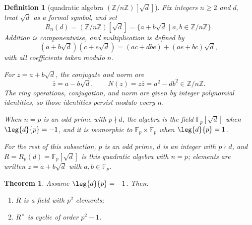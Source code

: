\documentclass[11pt]{article}
\theoremstyle{ntstyle}
\newtheorem{theorem}{Theorem}[subsection]
\newtheorem{definition}{Definition}[subsection]
\begin{document}
\begin{definition}[{quadratic algebra $(\mathbb{Z}/n\mathbb{Z})[\sqrt{d}]$}]\label{def:7.9.1}
	Fix integers $n\ge2$ and $d$, treat $\sqrt d$ as a formal symbol, and
	set
	\[
		R_n(d)=(\mathbb{Z}/n\mathbb{Z})[\sqrt d]
		=\{a+b\sqrt d\mid a,b\in\mathbb{Z}/n\mathbb{Z}\}.
	\]
	Addition is componentwise, and multiplication is defined by
	\[
		(a+b\sqrt d)(c+e\sqrt d)
		=(ac+dbe)+(ae+bc)\sqrt d,
	\]
	with all coefficients taken modulo $n$.

	For $z=a+b\sqrt d$, the conjugate and norm are
	\[
		\bar z=a-b\sqrt d,
		\qquad
		N(z)=z\bar z=a^2-db^2\in\mathbb{Z}/n\mathbb{Z}.
	\]
	The ring operations, conjugation, and norm are given by integer
	polynomial identities, so those identities persist modulo every $n$.

	When $n=p$ is an odd prime with $p\nmid d$, the algebra is the field
	$\mathbb{F}_p[\sqrt d]$ when $\leg{d}{p}=-1$, and it is isomorphic to
	$\mathbb{F}_p\times\mathbb{F}_p$ when $\leg{d}{p}=1$.

	For the rest of this subsection, $p$ is an odd prime,
	$d$ is an integer with $p\nmid d$, and
	$R=R_p(d)=\mathbb{F}_p[\sqrt d]$ is this quadratic algebra with
	$n=p$; elements are written $z=a+b\sqrt d$ with
	$a,b\in\mathbb{F}_p$.

\end{definition}

\begin{theorem}\label{thm:7.9.1} Assume $\leg{d}{p}=-1$. Then:
	\begin{enumerate}[label={\alph*)}]
		\item $R$ is a field with $p^{2}$ elements;
		\item $R^{\times}$ is cyclic of order $p^{2}-1$.
	\end{enumerate}

\end{theorem}
\end{document}
